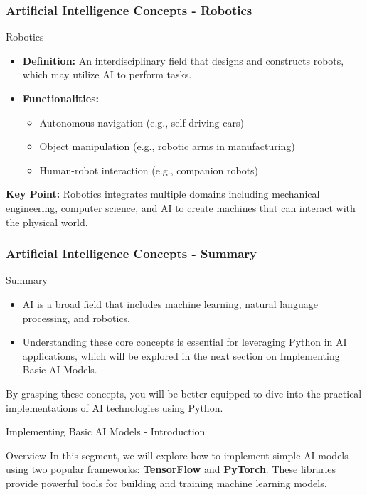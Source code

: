 \documentclass[aspectratio=169]{beamer}
\begin{document}
\begin{frame}[fragile]
    \frametitle{Artificial Intelligence Concepts - Robotics}
    \begin{block}{Robotics}
        \begin{itemize}
            \item \textbf{Definition:} An interdisciplinary field that designs and constructs robots, which may utilize AI to perform tasks.
            \item \textbf{Functionalities:}
            \begin{itemize}
                \item Autonomous navigation (e.g., self-driving cars)
                \item Object manipulation (e.g., robotic arms in manufacturing)
                \item Human-robot interaction (e.g., companion robots)
            \end{itemize}
        \end{itemize}
        
        \textbf{Key Point:} Robotics integrates multiple domains including mechanical engineering, computer science, and AI to create machines that can interact with the physical world.
    \end{block}
\end{frame}

\begin{frame}[fragile]
    \frametitle{Artificial Intelligence Concepts - Summary}
    \begin{block}{Summary}
        \begin{itemize}
            \item AI is a broad field that includes machine learning, natural language processing, and robotics.
            \item Understanding these core concepts is essential for leveraging Python in AI applications, which will be explored in the next section on Implementing Basic AI Models.
        \end{itemize}
        By grasping these concepts, you will be better equipped to dive into the practical implementations of AI technologies using Python.
    \end{block}
\end{frame}

\begin{frame}[fragile]{Implementing Basic AI Models - Introduction}
    \begin{block}{Overview}
        In this segment, we will explore how to implement simple AI models using two popular frameworks: 
        \textbf{TensorFlow} and \textbf{PyTorch}.
        These libraries provide powerful tools for building and training machine learning models.
    \end{block}
\end{frame}
\end{document}
